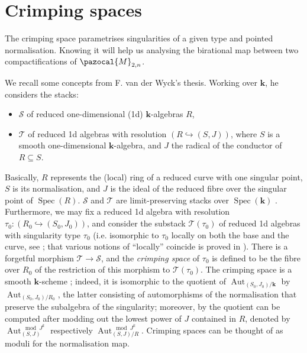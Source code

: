 \documentclass{compositio}
\renewcommand{\k}{\mathbf k}
\renewcommand{\to}{\rightarrow}
\newcommand{\Aut}{\operatorname{Aut}}
\theoremstyle{plain}
\theoremstyle{definition}
\theoremstyle{remark}
\begin{document}
 \appendix
 
 \section{Crimping spaces}\label{sec:crimp}
 The crimping space parametrises singularities of a given type and pointed normalisation. Knowing it will help us analysing the birational map between two compactifications of $\pazocal{M}_{2,n}$.

 \noindent We recall some concepts from F. van der Wyck's thesis.
Working over $\k$, he considers the stacks:
\begin{itemize}[leftmargin=.5cm]
 \item $\mathcal S$ of reduced one-dimensional (1d) $\k$-algebras $R$,
 \item $\mathcal T$ of reduced 1d algebras with resolution $(R\hookrightarrow (S,J))$, where $S$ is a smooth one-dimensional $\k$-algebra, and $J$ the radical of the conductor of $R\subseteq S$.
\end{itemize}
  Basically, $R$ represents the (local) ring of a reduced curve with one singular point, $S$ is its normalisation, and $J$ is the ideal of the reduced fibre over the singular point of $\operatorname{Spec}(R)$. $\mathcal S$ and $\mathcal T$ are limit-preserving stacks over $\operatorname{Spec}(\k)$ \cite[Proposition 1.21]{vdW}. Furthermore, we may fix a reduced 1d algebra with resolution $\tau_0:(R_0\hookrightarrow(S_0,J_0))$, and consider the substack $\mathcal T(\tau_0)$ of reduced 1d algebras with singularity type $\tau_0$ (i.e. isomorphic to $\tau_0$ locally on both the base and the curve, see \cite[Definition 1.64]{vdW}; that various notions of ``locally'' coincide is proved in \cite[Proposition 1.50]{vdW}). There is a forgetful morphism $\mathcal T\to\mathcal S$, and the \emph{crimping space} of $\tau_0$ is defined to be the fibre over $R_0$ of the restriction of this morphism to $\mathcal T(\tau_0)$. The crimping space is a smooth $\k$-scheme \cite[Theorems 1.70 and 1.73]{vdW}; indeed, it is isomorphic to the quotient of $\Aut_{(S_0,J_0)/\k}$ by $\Aut_{(S_0,J_0)/R_0}$, the latter consisting of automorphisms of the normalisation that preserve the subalgebra of the singularity; moreover, by \cite[Theorem 1.53]{vdW} the quotient can be computed after modding out the lowest power of $J$ contained in $R$, denoted by $\Aut_{(S,J)}^{\mod J^k}$ respectively $\Aut_{(S,J)/R}^{\mod J^k}$. Crimping spaces can be thought of as moduli for the normalisation map.
  
\end{document}
